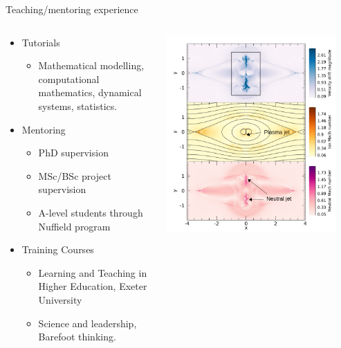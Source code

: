 \documentclass[10pt,aspectratio=169,usenames,dvipsnames]{beamer}
\begin{document}
\begin{frame}{Teaching/mentoring experience}
\begin{columns}
\begin{column}{0.5\textwidth}
\begin{itemize}
    \item Tutorials \\ \begin{itemize}
        \item Mathematical modelling, computational mathematics, dynamical systems, statistics.
    \end{itemize}
    \item Mentoring \\ \begin{itemize}
        \item PhD supervision
        \item MSc/BSc project supervision
        \item A-level students through Nuffield program
    \end{itemize}
    \item Training Courses\\ \begin{itemize}
        \item Learning and Teaching in Higher Education, Exeter University
        \item Science and leadership, Barefoot thinking.
    \end{itemize}
\end{itemize}
\end{column}
\begin{column}{0.5\textwidth}
\includegraphics[width=0.9\textwidth]{2023DundeeInterview/Figures/coalescenece.png}
\end{column}
\end{columns}
\end{frame}
\end{document}
